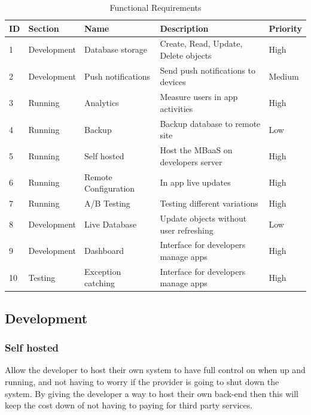 \begin{table}[h]
\centering
\caption{Functional Requirements}
\label{my-label}
\begin{tabular}{|l|l|l|l|l|}
\hline
\cellcolor{green!20}ID & \cellcolor{green!20}Section  & \cellcolor{green!20}Name  & \cellcolor{green!20}Description        & \cellcolor{green!20}Priority \\ \hline
1                      & Development                  & Database storage          & Create, Read, Update, Delete objects   & High   \\ \hline
2                      & Development                  & Push notifications        & Send push notifications to devices     & Medium \\ \hline
3                      & Running                      & Analytics                 & Measure users in app activities        & High   \\ \hline
4                      & Running                      & Backup                    & Backup database to remote site         & Low    \\ \hline
5                      & Running                      & Self hosted               & Host the MBaaS on developers server    & High   \\ \hline
6                      & Running                      & Remote Configuration      & In app live updates                    & High   \\ \hline
7                      & Running                      & A/B Testing               & Testing different variations           & High   \\ \hline
8                      & Development                  & Live Database             & Update objects without user refreshing & Low    \\ \hline
9                      & Development                  & Dashboard                & Interface for developers manage apps   & High   \\ \hline
10                     & Testing                      & Exception catching      & Interface for developers manage apps   & High   \\ \hline
\end{tabular}
\end{table}

\subsection{Development}

\subsubsection{Self hosted}
Allow the developer to host their own system to have full control on when up and running, and not having to worry if the provider is going to shut down the system. By giving the developer a way to host their own back-end then this will keep the cost down of not having to paying for third party services.

